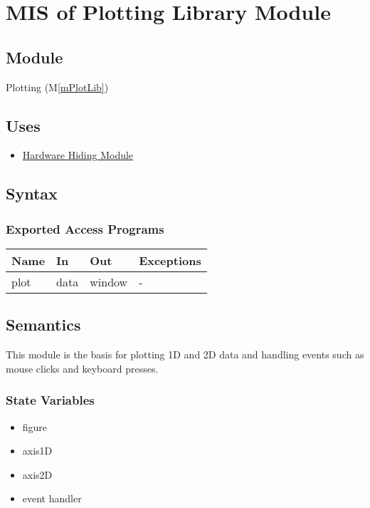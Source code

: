 \documentclass[12pt, titlepage]{article}
\newcommand{\mref}[1]{M\ref{#1}}
\begin{document}
\section{MIS of Plotting Library Module} \label{Mod:Plotting}

\subsection{Module}

Plotting (\mref{mPlotLib})

\subsection{Uses}
\begin{itemize}
    \item \hyperref[Mod:HH]{Hardware Hiding Module}
\end{itemize}

\subsection{Syntax}

\subsubsection{Exported Access Programs}

\begin{center}
    \begin{tabular}{p{2cm} p{4cm} p{4cm} p{2cm}}
        \hline
        \textbf{Name} & \textbf{In} & \textbf{Out} & \textbf{Exceptions} \\
        \hline
        plot & data & window & - \\
        \hline
    \end{tabular}
\end{center}

\subsection{Semantics}
This module is the basis for plotting 1D and 2D data and handling events such as
mouse clicks and keyboard presses.

\subsubsection{State Variables}
\begin{itemize}
    \item figure
    \item axis1D
    \item axis2D
    \item event handler
\end{itemize}
\end{document}

